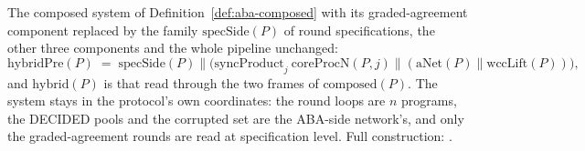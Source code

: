 \begin{definition}
  \label{def:aba-hybrid}
  \leanok
  The composed system of Definition~\ref{def:aba-composed} with its graded-agreement component replaced by the family $\mathrm{specSide}(P)$ of round specifications, the other three components and the whole pipeline unchanged:
  \[
    \mathrm{hybridPre}(P) \;=\;
      \mathrm{specSide}(P) \parallel \bigl(\mathrm{syncProduct}_{j}\ \mathrm{coreProcN}(P,j)
        \parallel (\mathrm{aNet}(P) \parallel \mathrm{wccLift}(P))\bigr),
  \]
  and $\mathrm{hybrid}(P)$ is that read through the two frames of $\mathrm{composed}(P)$.
  The system stays in the protocol's own coordinates: the round loops are $n$ programs, the DECIDED pools and the corrupted set are the ABA-side network's, and only the graded-agreement rounds are read at specification level.
  Full construction: .
\end{definition}
